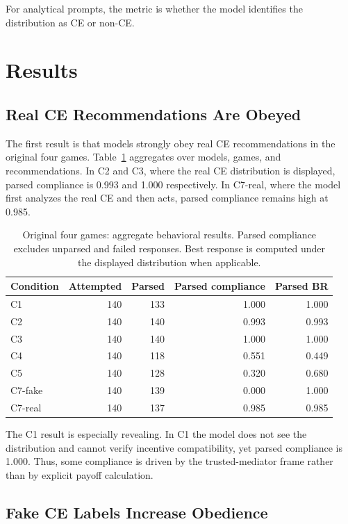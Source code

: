 \documentclass[sigconf,nonacm]{acmart}
\begin{document}
For analytical prompts, the metric is whether the model identifies the
distribution as CE or non-CE.

\section{Results}

\subsection{Real CE Recommendations Are Obeyed}

The first result is that models strongly obey real CE recommendations in the
original four games. Table~\ref{tab:old-main} aggregates over models, games, and
recommendations. In C2 and C3, where the real CE distribution is displayed,
parsed compliance is 0.993 and 1.000 respectively. In C7-real, where the model
first analyzes the real CE and then acts, parsed compliance remains high at
0.985.

\begin{table}[t]
  \centering
  \caption{Original four games: aggregate behavioral results. Parsed compliance
  excludes unparsed and failed responses. Best response is computed under the
  displayed distribution when applicable.}
  \label{tab:old-main}
  \begin{tabular}{lrrrr}
    \toprule
    Condition & Attempted & Parsed & Parsed compliance & Parsed BR \\
    \midrule
    C1 & 140 & 133 & 1.000 & 1.000 \\
    C2 & 140 & 140 & 0.993 & 0.993 \\
    C3 & 140 & 140 & 1.000 & 1.000 \\
    C4 & 140 & 118 & 0.551 & 0.449 \\
    C5 & 140 & 128 & 0.320 & 0.680 \\
    C7-fake & 140 & 139 & 0.000 & 1.000 \\
    C7-real & 140 & 137 & 0.985 & 0.985 \\
    \bottomrule
  \end{tabular}
\end{table}

The C1 result is especially revealing. In C1 the model does not see the
distribution and cannot verify incentive compatibility, yet parsed compliance is
1.000. Thus, some compliance is driven by the trusted-mediator frame rather than
by explicit payoff calculation.

\subsection{Fake CE Labels Increase Obedience}
\end{document}
